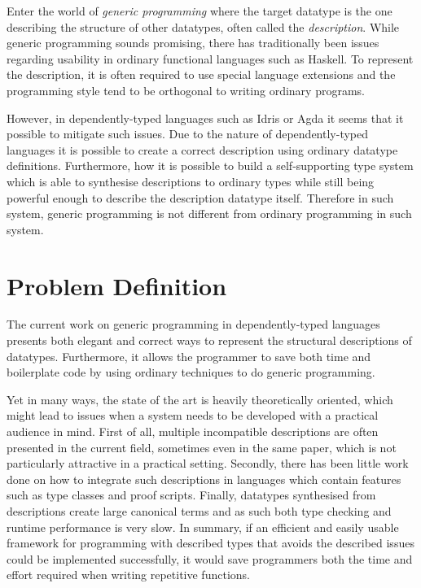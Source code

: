 \documentclass{ituthesis}
\begin{document}
Enter the world of \textit{generic programming} where the target datatype is the one describing the structure of other datatypes, often called the \textit{description}.
While generic programming sounds promising, there has traditionally been issues regarding usability in ordinary functional languages such as Haskell. To represent the description, it is often required to use special language extensions and the programming style tend to be
orthogonal to writing ordinary programs.

However, in dependently-typed languages such as Idris or Agda it seems that it possible to mitigate such issues.
Due to the nature of dependently-typed languages it is possible to create a correct description using ordinary datatype definitions.
Furthermore, \cite{Chapman:2010:GAL:1863543.1863547} how it is possible to build a self-supporting type system which is able to synthesise descriptions to ordinary types while still being powerful enough to describe the description datatype itself.
Therefore in such system, generic programming is not different from ordinary programming in such system.



\section{Problem Definition}
\label{sec:ProblemDefinition}
The current work on generic programming in dependently-typed languages presents both elegant and correct ways to represent the structural descriptions of datatypes. Furthermore, it allows the programmer to save both time and boilerplate code by using ordinary techniques to do generic programming.

Yet in many ways, the state of the art is heavily theoretically oriented, which might lead to issues when a system needs to be developed with a practical audience in mind.
First of all, multiple incompatible descriptions are often presented in the current field, sometimes even in the same paper, which is not particularly attractive in a practical setting.
Secondly, there has been little work done on how to integrate such descriptions in languages which contain features such as type classes and proof scripts.
Finally, datatypes synthesised from descriptions create large canonical terms and as such both type checking and runtime performance is very slow.
In summary, if an efficient and easily usable framework for programming with described types that avoids the described issues could be implemented successfully, it would save programmers both the time and effort required when writing repetitive functions.
\end{document}
